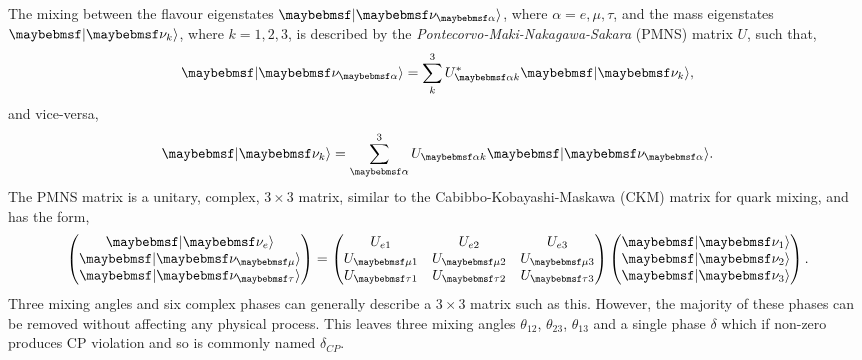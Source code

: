 The mixing between the flavour eigenstates $\ket{\nu_{\alpha}}$, where $\alpha=e,\mu,\tau$, and
the mass eigenstates $\ket{\nu_{k}}$, where $k=1,2,3$, is described by the
\emph{Pontecorvo-Maki-Nakagawa-Sakara} (PMNS) matrix $U$, such that,
\begin{equation} %
    \ket{\nu_{\alpha}}=\sum_{k}^{3}U_{\alpha k}^{*}\ket{\nu_{k}},
\end{equation}
and vice-versa,
\begin{equation} %
    \ket{\nu_{k}}=\sum_{\alpha}^{3}U_{\alpha k}\ket{\nu_{\alpha}}.
\end{equation}
The PMNS matrix is a unitary, complex, $3\times3$ matrix, similar to the Cabibbo-Kobayashi-Maskawa
(CKM) matrix for quark mixing, and has the form,
\begin{gather} %
    \begin{pmatrix}
        \ket{\nu_{e}}   \\
        \ket{\nu_{\mu}} \\
        \ket{\nu_{\tau}}
    \end{pmatrix}
    =
    \begin{pmatrix}
        U_{e1}     & U_{e2}     & U_{e3}     \\
        U_{\mu 1}  & U_{\mu 2}  & U_{\mu 3}  \\
        U_{\tau 1} & U_{\tau 2} & U_{\tau 3}
    \end{pmatrix}
    \begin{pmatrix}
        \ket{\nu_{1}} \\
        \ket{\nu_{2}} \\
        \ket{\nu_{3}}
    \end{pmatrix}.
\end{gather} %
Three mixing angles and six complex phases can generally describe a $3\times3$ matrix such as
this. However, the majority of these phases can be removed without affecting any physical process.
This leaves three mixing angles $\theta_{12}$, $\theta_{23}$, $\theta_{13}$ and a single phase
$\delta$ which if non-zero produces CP violation and so is commonly named $\delta_{CP}$.

